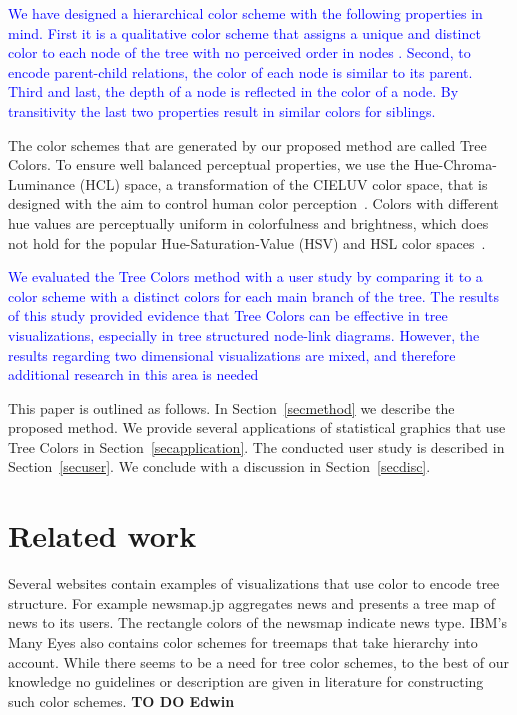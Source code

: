 \documentclass[journal]{vgtc}                %
\newcommand{\E}{\textcolor{cornellred}{\textbf{TO DO Edwin}}}
\newcommand{\changedE}[1]{\textcolor{cornellred}{#1}}
\newcommand{\changedM}[1]{\textcolor{blue}{#1}}
\begin{document}
\changedM{We have designed a hierarchical color scheme with the following properties in mind. First it is a qualitative color scheme that assigns a unique and distinct color to each node of the tree with no perceived order in nodes \cite{brewer03, zeileis2009}. Second, to encode parent-child relations, the color of each node is similar to its parent. Third and last, the depth of a node is reflected in the color of a node. By transitivity the last two properties result in similar colors for siblings.}

The color schemes that are generated by our proposed method are called Tree Colors. To ensure well
balanced perceptual properties, we use the Hue-Chroma-Luminance (HCL) space, a transformation of the CIELUV color space, that is designed with the aim to control human color perception~\cite{ihaka2003}. Colors with different hue values are perceptually uniform in colorfulness and brightness, which does not hold for the popular Hue-Saturation-Value (HSV) and HSL color spaces~\cite{zeileis2009}.

\changedM{We evaluated the Tree Colors method with a user study by comparing it to a color scheme with a distinct colors for each main branch of the tree. The results of this study provided evidence that Tree Colors can be effective in tree visualizations, especially in tree structured node-link diagrams. However, the results regarding two dimensional visualizations are mixed, and therefore additional research in this area is needed}

This paper is outlined as follows. In Section~\ref{secmethod} we describe the proposed method. We provide several applications of statistical graphics that use Tree Colors in Section~\ref{secapplication}. The conducted user study is described in Section~\ref{secuser}. We conclude with a discussion in Section~\ref{secdisc}.

\section{Related work}
\changedE{
Several websites contain examples of visualizations that use color to encode tree structure. For example newsmap.jp 
\cite{newsmap} aggregates news and presents a tree map of news to its users. The rectangle colors of the newsmap 
indicate news type. IBM's Many Eyes \cite{manyeyes} also contains color schemes for treemaps that take hierarchy 
into account. While there seems to be a need for tree color schemes, to the best of our knowledge no guidelines or 
description are given in literature for constructing such color schemes.
} \E
\end{document}
